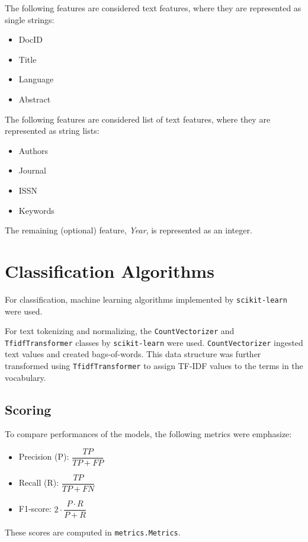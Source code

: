 \documentclass[11pt]{article}
\begin{document}
The following features are considered text features, where they are represented as single strings:
\begin{itemize}
    \item DocID
    \item Title
    \item Language
    \item Abstract
\end{itemize}

The following features are considered list of text features, where they are represented as string lists:
\begin{itemize}
    \item Authors
    \item Journal
    \item ISSN
    \item Keywords
\end{itemize}

The remaining (optional) feature, \textit{Year}, is represented as an integer.

\section*{Classification Algorithms}
For classification, machine learning algorithms implemented by \texttt{scikit-learn} were used.

For text tokenizing and normalizing, the \texttt{CountVectorizer} and \texttt{TfidfTransformer} classes by \texttt{scikit-learn} were used. \texttt{CountVectorizer} ingested text values and created bags-of-words. This data structure was further transformed using \texttt{TfidfTransformer} to assign TF-IDF values to the terms in the vocabulary.

\subsection*{Scoring}
To compare performances of the models, the following metrics were emphasize:
\begin{itemize}
\setlength\itemsep{1em}
    \item Precision (P): $ \dfrac{TP}{TP + FP} $
    \item Recall (R): $ \dfrac{TP}{TP + FN} $
    \item F1-score: $ 2 \cdot \dfrac{P \cdot R}{P+R} $
\end{itemize}

These scores are computed in \texttt{metrics.Metrics}.
\end{document}

